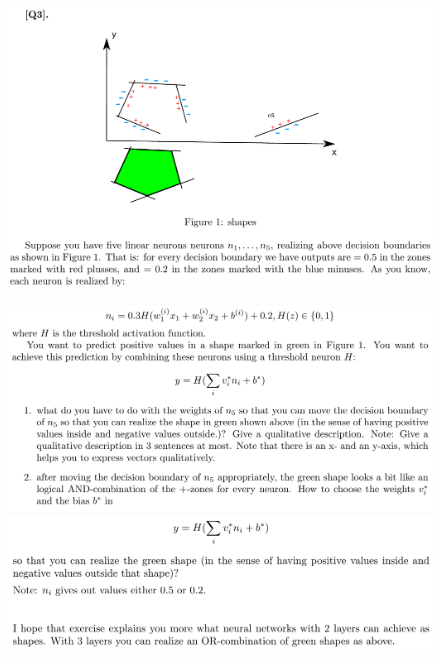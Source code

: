 \documentclass[12pt]{article}
\begin{document}
\begin{figure}[h!]
\includegraphics[width=\linewidth]{./assets/201806161636.png}
\end{figure}
\pagebreak
\begin{figure}[h!]
\includegraphics[width=\linewidth]{./assets/201806161708.png}
\includegraphics[width=\linewidth]{./assets/201806161709.png}
\end{figure}
\end{document}
